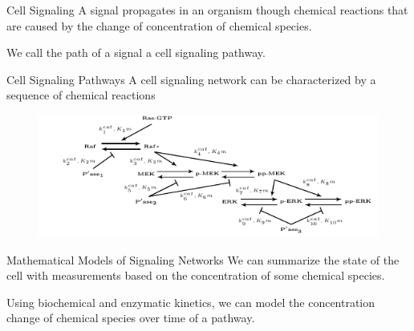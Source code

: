 \documentclass{beamer}
\begin{document}
\begin{frame}{Cell Signaling}
A signal propagates in an organism though chemical reactions that are
caused by the change of concentration of chemical species.

\pause
We call the path of a signal a cell signaling pathway.
\end{frame}


\begin{frame}{Cell Signaling Pathways}
A cell signaling network can be characterized by a sequence of chemical 
reactions 
\begin{figure}
    \includegraphics[scale=1.2, trim={.5cm 0 0 0}, clip]{introduction/csp_example.pdf}
\end{figure}
\end{frame}

\begin{frame}{Mathematical Models of Signaling Networks}
We can summarize the state of the cell with measurements based on the 
concentration of some chemical species.
\pause

Using biochemical and enzymatic kinetics, we can model the concentration
change of chemical species over time of a pathway.
\end{frame}




\end{document}
